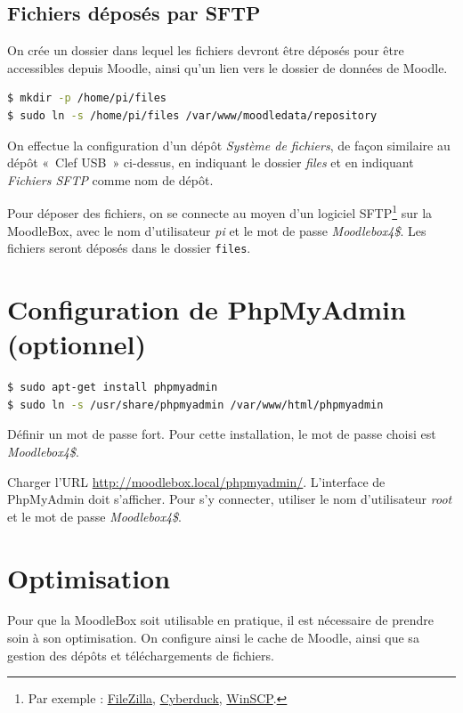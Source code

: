 \documentclass[11pt]{article}
\begin{document}
\subsection{Fichiers déposés par SFTP}

On crée un dossier dans lequel les fichiers devront être déposés pour être accessibles depuis Moodle, ainsi qu'un lien vers le dossier de données de Moodle.

\begin{lstlisting}[language=bash]
$ mkdir -p /home/pi/files
$ sudo ln -s /home/pi/files /var/www/moodledata/repository
\end{lstlisting}

On effectue la configuration d'un dépôt \emph{Système de fichiers}, de façon similaire au dépôt « Clef USB » ci-dessus, en indiquant le dossier \emph{files} et en indiquant \emph{Fichiers SFTP} comme nom de dépôt.

Pour déposer des fichiers, on se connecte au moyen d'un logiciel SFTP\footnote{Par exemple : \href{https://filezilla-project.org/}{FileZilla}, \href{https://cyberduck.io/}{Cyberduck}, \href{http://winscp.net/}{WinSCP}.} sur la MoodleBox, avec le nom d'utilisateur \emph{pi} et le mot de passe \emph{Moodlebox4\$}. Les fichiers seront déposés dans le dossier \lstinline{files}.

\section{Configuration de PhpMyAdmin (optionnel)}

\begin{lstlisting}[language=bash]
$ sudo apt-get install phpmyadmin
$ sudo ln -s /usr/share/phpmyadmin /var/www/html/phpmyadmin
\end{lstlisting}
Définir un mot de passe fort. Pour cette installation, le mot de passe choisi est \emph{Moodlebox4\$}.

\begin{verification}
Charger l'URL \url{http://moodlebox.local/phpmyadmin/}. L'interface de PhpMyAdmin doit s'afficher. Pour s'y connecter, utiliser le nom d'utilisateur \emph{root} et le mot de passe \emph{Moodlebox4\$}.
\end{verification}

\section{Optimisation}

Pour que la MoodleBox soit utilisable en pratique, il est nécessaire de prendre soin à son optimisation. On configure ainsi le cache de Moodle, ainsi que sa gestion des dépôts et téléchargements de fichiers.
\end{document}
